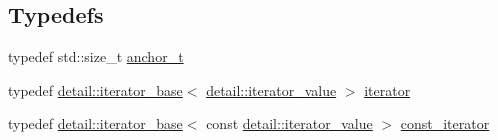 \subsection*{Typedefs}
\begin{DoxyCompactItemize}
\item 
typedef std\+::size\+\_\+t \mbox{\hyperlink{namespace_y_a_m_l_abeff1798814ae3402fc5665fdcad1de6}{anchor\+\_\+t}}
\item 
typedef \mbox{\hyperlink{class_y_a_m_l_1_1detail_1_1iterator__base}{detail\+::iterator\+\_\+base}}$<$ \mbox{\hyperlink{struct_y_a_m_l_1_1detail_1_1iterator__value}{detail\+::iterator\+\_\+value}} $>$ \mbox{\hyperlink{namespace_y_a_m_l_a057e57e7f23a1b85ea32bbc730b94d24}{iterator}}
\item 
typedef \mbox{\hyperlink{class_y_a_m_l_1_1detail_1_1iterator__base}{detail\+::iterator\+\_\+base}}$<$ const \mbox{\hyperlink{struct_y_a_m_l_1_1detail_1_1iterator__value}{detail\+::iterator\+\_\+value}} $>$ \mbox{\hyperlink{namespace_y_a_m_l_a0a1f3211b4b1f42bb8e6a9fde49b5c44}{const\+\_\+iterator}}
\end{DoxyCompactItemize}
